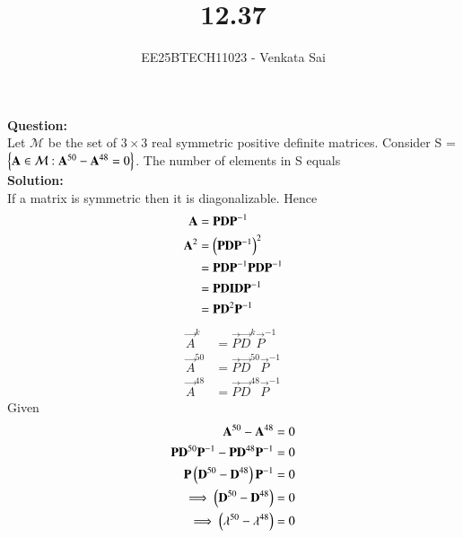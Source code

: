 \documentclass[journal]{IEEEtran}
\begin{document}


\title{12.37}
\author{EE25BTECH11023 - Venkata Sai}
\maketitle 
\renewcommand{\thefigure}{\theenumi}
\renewcommand{\thetable}{\theenumi}
\setlength{\intextsep}{10pt} %

\renewcommand{\thetable}{\theenumi}

\textbf{Question:}  \\
Let $\mathcal{M}$ be the set of $3\times3 $ real symmetric positive definite matrices. Consider S =
$\left\{\mathbf{A} \in \mathcal{M}: \mathbf{A}^{50} - \mathbf{A}^{48} = 0 \right\}$. The number of elements in S equals \\
\textbf{Solution:}  \\
 If a matrix is symmetric then it is  diagonalizable. Hence
 \begin{align}
     \mathbf{A}&=\mathbf{P}\mathbf{D}\mathbf{P}^{-1} \\
      \mathbf{A}^2&=\left(\mathbf{P}\mathbf{D}\mathbf{P}^{-1}\right)^2 \\
      &=\mathbf{P}\mathbf{D}\mathbf{P}^{-1}\mathbf{P}\mathbf{D}\mathbf{P}^{-1}\\
      &=\mathbf{P}\mathbf{D}\mathbf{I}\mathbf{D}\mathbf{P}^{-1}\\
      &=\mathbf{P}\mathbf{D}^2\mathbf{P}^{-1}
 \end{align}
 \begin{align}
     \vec{A}^k&=\vec{P}\vec{D}^k\vec{P}^{-1}\\
     \vec{A}^{50}&=\vec{P}\vec{D}^{50}\vec{P}^{-1}\\
     \vec{A}^{48}&=\vec{P}\vec{D}^{48}\vec{P}^{-1}
 \end{align}
 Given 
 \begin{align}
   \mathbf{A}^{50} - \mathbf{A}^{48} = 0\\
   \mathbf{P}\mathbf{D}^{50}\mathbf{P}^{-1}-\mathbf{P}\mathbf{D}^{48}\mathbf{P}^{-1}=0 \\
   \mathbf{P}\left(\mathbf{D}^{50}-\mathbf{D}^{48}\right)\mathbf{P}^{-1}=0 \\
   \implies \left(\mathbf{D}^{50}-\mathbf{D}^{48}\right)=0\\
   \implies \left(\mathbf{\lambda}^{50}-\mathbf{\lambda}^{48}\right)=0
 \end{align}
\end{document}
